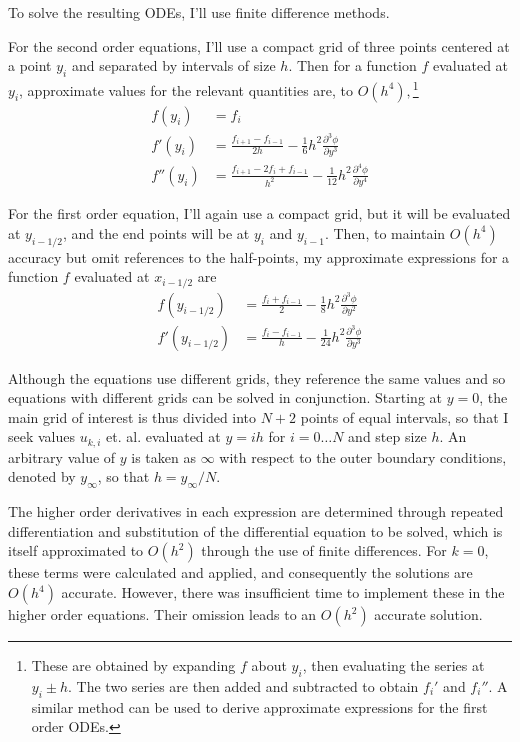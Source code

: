 \documentclass[10pt,a4paper]{report}
\begin{document}
To solve the resulting ODEs, I'll use finite difference methods.

For the second order equations, I'll use a compact grid of three points centered at a point $y_i$ and separated by intervals of size $h$. Then for a function $f$ evaluated at $y_i$, approximate values for the relevant quantities are, to $O(h^4),$\footnote{These are obtained by expanding $f$ about $y_i$, then evaluating the series at $y_i \pm h$. The two series are then added and subtracted to obtain $f_i'$ and $f_i''$. A similar method can be used to derive approximate expressions for the first order ODEs.}
\begin{align*}
f(y_i) & = f_i \\
f'(y_i) & = \frac{f_{i+1} - f_{i-1}}{2h} - \frac{1}{6} h^2 \frac{\partial^3 \phi}{\partial y^3}\\
f''(y_i) & = \frac{f_{i+1} - 2 f_i + f_{i-1}}{h^2} - \frac{1}{12} h^2 \frac{\partial^4 \phi}{\partial y^4}
\end{align*}

For the first order equation, I'll again use a compact grid, but it will be evaluated at $y_{i-1/2}$, and the end points will be at $y_i$ and $y_{i-1}$. Then, to maintain $O(h^4)$ accuracy but omit references to the half-points, my approximate expressions for a function $f$ evaluated at $x_{i-1/2}$ are
\begin{align*}
f(y_{i-1/2}) & = \frac{f_i + f_{i-1}}{2} - \frac{1}{8} h^2 \frac{\partial^3 \phi}{\partial y^2}\\
f'(y_{i-1/2}) & = \frac{f_i - f_{i-1}}{h} - \frac{1}{24} h^2 \frac{\partial^3 \phi}{\partial y^3}
\end{align*}

Although the equations use different grids, they reference the same values and so equations with different grids can be solved in conjunction. Starting at $y = 0$, the main grid of interest is thus divided into $N+2$ points of equal intervals, so that I seek values $u_{k,i}$ et. al. evaluated at $y = i h$ for $i = 0 \dotso N$ and step size $h$. An arbitrary value of $y$ is taken as $\infty$ with respect to the outer boundary conditions, denoted by $y_\infty$, so that $h = y_\infty / N$.

The higher order derivatives in each expression are determined through repeated differentiation and substitution of the differential equation to be solved, which is itself approximated to $O(h^2)$ through the use of finite differences. For $k=0$, these terms were calculated and applied, and consequently the solutions are $O(h^4)$ accurate. However, there was insufficient time to implement these in the higher order equations. Their omission leads to an $O(h^2)$ accurate solution.
\end{document}
